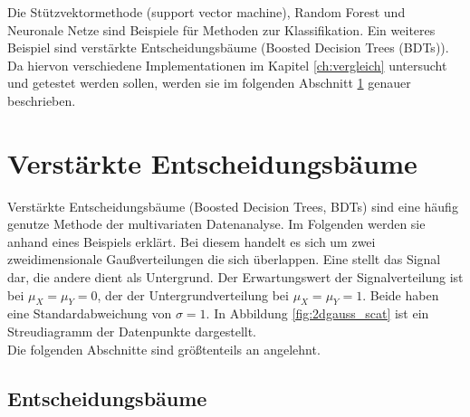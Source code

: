 Die St\"utzvektormethode (support vector machine), Random Forest und Neuronale Netze sind Beispiele f\"ur Methoden zur Klassifikation. 
Ein weiteres Beispiel sind verst\"arkte Entscheidungsb\"aume (Boosted Decision Trees (BDTs)). Da hiervon verschiedene Implementationen im Kapitel \ref{ch:vergleich} untersucht und getestet werden sollen, werden sie im folgenden Abschnitt \ref{ch:Algorithmen:sec:BDT} genauer beschrieben.

\section{Verst\"arkte Entscheidungsb\"aume}
\label{ch:Algorithmen:sec:BDT}

Verst\"arkte Entscheidungsb\"aume (Boosted Decision Trees, BDTs) sind eine h\"aufig genutze Methode der multivariaten Datenanalyse. Im Folgenden werden sie anhand eines Beispiels erkl\"art. Bei diesem handelt es sich um zwei zweidimensionale Gau\ss verteilungen die sich \"uberlappen. Eine stellt das Signal dar, die andere dient als Untergrund. Der Erwartungswert der Signalverteilung ist bei $\mu_X=\mu_Y=0$, der der Untergrundverteilung bei $\mu_X=\mu_Y=1$. Beide haben eine Standardabweichung von $\sigma=1$. In Abbildung \ref{fig:2dgauss_scat} ist ein Streudiagramm der Datenpunkte dargestellt.\\
Die folgenden Abschnitte sind gr\"o\ss tenteils an \cite{SWB-307748006} angelehnt.

\subsection{Entscheidungsb\"aume}
\label{ch:Algorithmen:subsec:Entscheidungsbaum}

